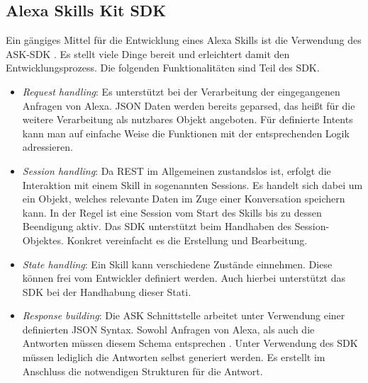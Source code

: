 \subsection{Alexa Skills Kit SDK}
\label{subsec:skill-ask-sdk}
Ein gängiges Mittel für die Entwicklung eines Alexa Skills ist die Verwendung des \ac{ASK}-\ac{SDK} \cite{alexa-sdk}. Es stellt viele Dinge bereit und erleichtert damit den Entwicklungsprozess. Die folgenden Funktionalitäten sind \ua Teil des \ac{SDK}.

\begin{itemize}
    \item \textit{Request handling}: Es unterstützt bei der Verarbeitung der eingegangenen Anfragen von Alexa. \ac{JSON} Daten werden bereits geparsed, das heißt für die weitere Verarbeitung als nutzbares Objekt angeboten. Für definierte Intents kann man auf einfache Weise die Funktionen mit der entsprechenden Logik adressieren.
    
    \item \textit{Session handling}: Da \ac{REST} im Allgemeinen zustandslos ist, erfolgt die Interaktion mit einem Skill in sogenannten Sessions. Es handelt sich dabei um ein Objekt, welches relevante Daten im Zuge einer Konversation speichern kann. In der Regel ist eine Session vom Start des Skills bis zu dessen Beendigung aktiv. Das \ac{SDK} unterstützt beim Handhaben des Session-Objektes. Konkret vereinfacht es die Erstellung und Bearbeitung. 
    
    \item \textit{State handling}: Ein Skill kann verschiedene Zustände einnehmen. Diese können frei vom Entwickler definiert werden. Auch hierbei unterstützt das \ac{SDK} bei der Handhabung dieser Stati. 
    
    \item \textit{Response building}: Die \ac{ASK} Schnittstelle arbeitet unter Verwendung einer definierten \ac{JSON} Syntax. Sowohl Anfragen von Alexa, als auch die Antworten müssen diesem Schema entsprechen \cite{alexa-response-request-format}. Unter Verwendung des \ac{SDK} müssen lediglich die Antworten selbst generiert werden. Es erstellt im Anschluss die notwendigen Strukturen für die Antwort.
\end{itemize}

